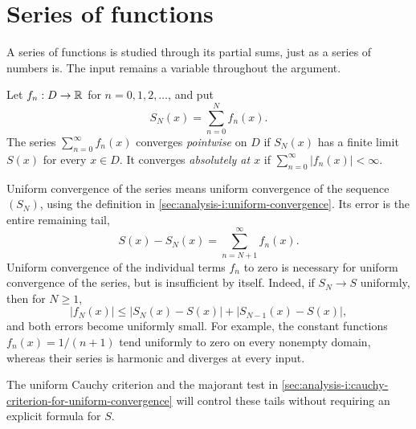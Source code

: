 \section{Series of functions}
\label{sec:analysis-i:series-of-functions}


A series of functions is studied through its partial sums, just as a
series of numbers is. The input remains a variable throughout the
argument.

\begin{definition}
  \label{thm:analysis-i:function-series}
  Let $f_n:D\to\mathbb{R}$ for $n=0,1,2,\ldots$, and put
  \[
    S_N(x)=\sum_{n=0}^{N}f_n(x).
  \]
  The series $\sum_{n=0}^{\infty}f_n(x)$ converges \emph{pointwise} on
  $D$ if $S_N(x)$ has a finite limit $S(x)$ for every $x\in D$.
  It converges \emph{absolutely at $x$} if
  $\sum_{n=0}^{\infty}|f_n(x)|<\infty$.
\end{definition}

Uniform convergence of the series means uniform convergence of the
sequence $(S_N)$, using the definition in
\autoref{sec:analysis-i:uniform-convergence}. Its error is the entire
remaining tail,
\[
  S(x)-S_N(x)=\sum_{n=N+1}^{\infty}f_n(x).
\]
Uniform convergence of the individual terms $f_n$ to zero is necessary
for uniform convergence of the series, but is insufficient by itself.
Indeed, if $S_N\to S$ uniformly, then for $N\ge1$,
\[
  |f_N(x)|\le |S_N(x)-S(x)|+|S_{N-1}(x)-S(x)|,
\]
and both errors become uniformly small.
For example, the constant functions $f_n(x)=1/(n+1)$ tend uniformly to
zero on every nonempty domain, whereas their series is harmonic and
diverges at every input.

The uniform Cauchy criterion and the majorant test in
\autoref{sec:analysis-i:cauchy-criterion-for-uniform-convergence} will
control these tails without requiring an explicit formula for $S$.

